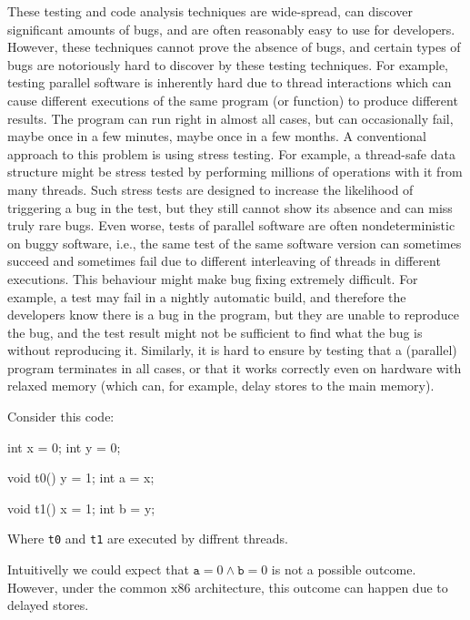 These testing and code analysis techniques are wide-spread, can discover significant amounts of bugs, and are often reasonably easy to use for developers.
However, these techniques cannot prove the absence of bugs, and certain types of bugs are notoriously hard to discover by these testing techniques.
For example, testing parallel software is inherently hard due to thread interactions which can cause different executions of the same program (or function) to produce different results.
The program can run right in almost all cases, but can occasionally fail, maybe once in a few minutes, maybe once in a few months.
A conventional approach to this problem is using stress testing.
For example, a thread-safe data structure might be stress tested by performing millions of operations with it from many threads.
Such stress tests are designed to increase the likelihood of triggering a bug in the test, but they still cannot show its absence and can miss truly rare bugs.
Even worse, tests of parallel software are often nondeterministic on buggy software, i.e., the same test of the same software version can sometimes succeed and sometimes fail due to different interleaving of threads in different executions.
This behaviour might make bug fixing extremely difficult.
For example, a test may fail in a nightly automatic build, and therefore the developers know there is a bug in the program, but they are unable to reproduce the bug, and the test result might not be sufficient to find what the bug is without reproducing it.
Similarly, it is hard to ensure by testing that a (parallel) program terminates in all cases, or that it works correctly even on hardware with relaxed memory (which can, for example, delay stores to the main memory).\begin{marginnote}%
Consider this code:

\medskip
\begin{cppcode}
int x = 0;
int y = 0;

void t0() {
  y = 1;
  int a = x;
}

void t1() {
  x = 1;
  int b = y;
}
\end{cppcode}

Where \texttt{t0} and \texttt{t1} are executed by diffrent threads.

Intuitivelly we could expect that $\texttt{a} = 0 \land \texttt{b} = 0$ is not a possible outcome.
However, under the common x86 architecture, this outcome can happen due to delayed stores.
\end{marginnote}

